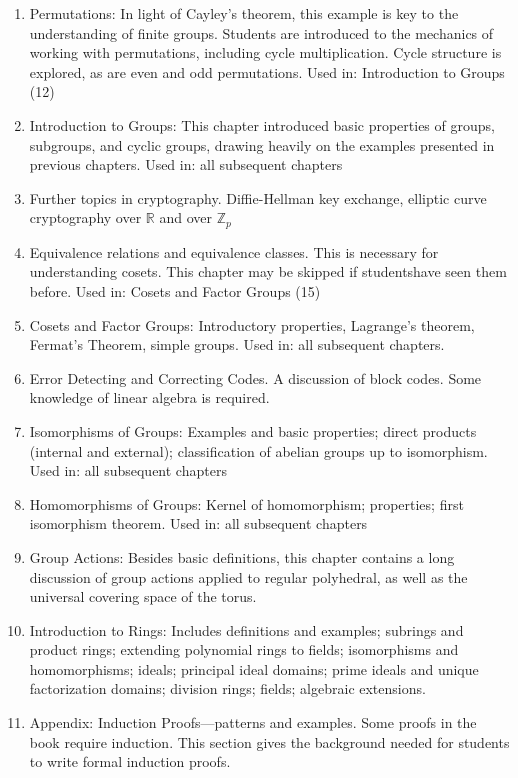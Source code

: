\begin{enumerate}
\item
Permutations: In light of Cayley’s theorem, this example is key to the understanding of finite groups. Students are introduced to the mechanics of working with permutations, including cycle multiplication. Cycle structure is explored, as are even and odd permutations. Used in:  Introduction to Groups (12)
\item
Introduction to Groups: This chapter introduced basic properties of groups, subgroups, and cyclic groups, drawing heavily on the examples presented in previous chapters. Used in:  all subsequent chapters
\item
Further topics in cryptography.  Diffie-Hellman key exchange, elliptic curve cryptography over ${\mathbb R}$ and over ${\mathbb Z}_p$
\item
Equivalence relations and equivalence classes. This is necessary for understanding cosets. This chapter may be skipped if studentshave seen them before.  Used in:  Cosets and Factor Groups (15)
\item
Cosets and Factor Groups: Introductory properties, Lagrange’s theorem, Fermat’s Theorem, simple groups.  Used in: all subsequent chapters.
\item
Error Detecting and Correcting Codes. A discussion of block codes. Some knowledge of linear algebra is required.
\item
Isomorphisms of Groups: Examples and basic properties; direct products (internal and external); classification of abelian groups up to isomorphism. Used in: all subsequent chapters
\item
Homomorphisms of Groups: Kernel of homomorphism; properties; first isomorphism theorem.  Used in: all subsequent chapters
\item
Group Actions: Besides basic definitions, this chapter contains a long discussion of group actions applied to regular polyhedral, as well as the universal covering space of the torus.
\item
Introduction to Rings:  Includes definitions and examples; subrings and product rings; extending polynomial rings to fields;  isomorphisms and homomorphisms; ideals; principal ideal domains; prime ideals and unique factorization domains; division rings; fields;  algebraic extensions. 
\item
Appendix: Induction Proofs—patterns and examples.  Some proofs in the book require induction. This section gives the background needed for students to write formal induction proofs. 
\end{enumerate}

